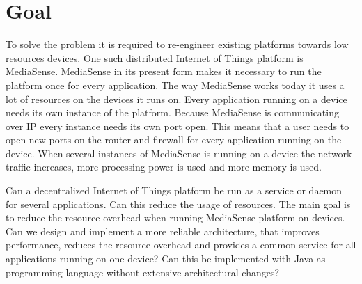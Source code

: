 \section{Goal}
To solve the problem it is required to re-engineer existing platforms towards low resources devices. One such distributed Internet of Things platform is MediaSense. MediaSense in its present form makes it necessary to run the platform once for every application. The way MediaSense works today it uses a lot of resources on the devices it runs on. Every application running on a device needs its own instance of the platform. Because MediaSense is communicating over IP every instance needs its own port open. This means that a user needs to open new ports on the router and firewall for every application running on the device. When several instances of MediaSense is running on a device the network traffic increases, more processing power is used and more memory is used. 

Can a decentralized Internet of Things platform be run as a service or daemon for several applications. Can this reduce the usage of resources. The main goal is to reduce the resource overhead when running MediaSense platform on devices. Can we design and implement a more reliable architecture, that improves performance, reduces the resource overhead and provides a common service for all applications running on one device? Can this be implemented with Java as programming language without extensive architectural changes?